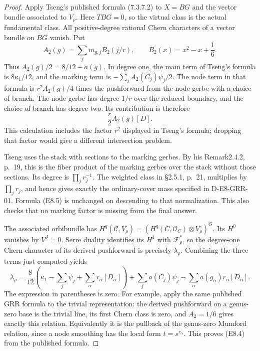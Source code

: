 \begin{proof}
Apply Tseng's published formula (7.3.7.2) to $X=BG$ and the vector
bundle associated to $V_\rho$.  Here $TBG=0$, so the virtual class is
the actual fundamental class.  All positive-degree rational Chern
characters of a vector bundle on $BG$ vanish.  Put
\[
 A_2(g)=\sum_jm_{g,j}B_2(j/r),\qquad
 B_2(x)=x^2-x+\frac16.
\]
Thus $A_2(g)/2=8/12-a(g)$.  In degree one, the main term of Tseng's
formula is $8\kappa_1/12$, and the marking term is
$-\sum_j A_2(C_j)\psi_j/2$.  The node term in that formula is
$r^2 A_2(g)/4$ times the pushforward from the node gerbe with a
choice of branch.  The node gerbe has degree $1/r$ over the reduced
boundary, and the choice of branch has degree two.  Its contribution
is therefore
\[
                       \frac r2 A_2(g)[D].                    \tag{E8.5}
\]
This calculation includes the factor $r^2$ displayed in Tseng's
formula; dropping that factor would give a different intersection
problem.

Tseng uses the stack with sections to the marking gerbes.  By his
Remark2.4.2, p.~19, this is the fiber product of the marking gerbes
over the stack without those sections.  Its degree is
$\prod_jr_j^{-1}$.  The weighted class in \S2.5.1, p.~21, multiplies
by $\prod_jr_j$, and hence gives exactly the ordinary-cover mass
specified in D-E8-GRR-01.  Formula (E8.5) is unchanged on descending
to that normalization.  This also checks that no marking factor is
missing from the final answer.

The associated orbibundle has
$H^q(\mathcal C,V_\rho)=(H^q(C,\mathcal O_C)\otimes V_\rho)^G$.
Its $H^0$ vanishes by $V^J=0$.  Serre duality identifies its $H^1$
with $\mathcal F_\rho^*$, so the degree-one Chern character of its
derived pushforward is precisely $\lambda_\rho$.  Combining the
three terms just computed yields
\[
 \lambda_\rho=\frac8{12}
  \left(\kappa_1-\sum_j\psi_j+\sum_\alpha r_\alpha[D_\alpha]\right)
  +\sum_ja(C_j)\psi_j
  -\sum_\alpha a(g_\alpha)r_\alpha[D_\alpha].                 \tag{E8.6}
\]
The expression in parentheses is zero.  For example, apply the same
published GRR formula to the trivial representation: the derived
pushforward on a genus-zero base is the trivial line, its first
Chern class is zero, and $A_2=1/6$ gives exactly this relation.
Equivalently it is the pullback of the genus-zero Mumford relation,
since a node smoothing has the local form $t=s^{r_\alpha}$.
This proves (E8.4) from the published formula.
\end{proof}

